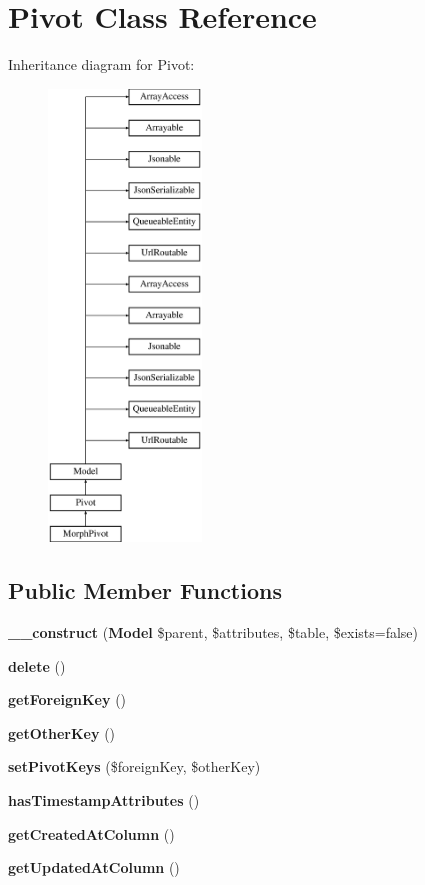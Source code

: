 \section{Pivot Class Reference}
\label{class_illuminate_1_1_database_1_1_eloquent_1_1_relations_1_1_pivot}
Inheritance diagram for Pivot\+:\begin{figure}[H]
\begin{center}
\leavevmode
\includegraphics[height=12.000000cm]{class_illuminate_1_1_database_1_1_eloquent_1_1_relations_1_1_pivot}
\end{center}
\end{figure}
\subsection*{Public Member Functions}
\begin{DoxyCompactItemize}
\item 
{\bf \+\_\+\+\_\+construct} ({\bf Model} \$parent, \$attributes, \$table, \$exists=false)
\item 
{\bf delete} ()
\item 
{\bf get\+Foreign\+Key} ()
\item 
{\bf get\+Other\+Key} ()
\item 
{\bf set\+Pivot\+Keys} (\$foreign\+Key, \$other\+Key)
\item 
{\bf has\+Timestamp\+Attributes} ()
\item 
{\bf get\+Created\+At\+Column} ()
\item 
{\bf get\+Updated\+At\+Column} ()
\end{DoxyCompactItemize}
